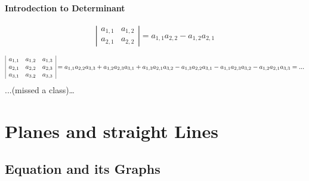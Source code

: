 \documentclass[11pt]{book}
\begin{document}
\paragraph{Introdection to Determinant}

$$
\left|\begin{array}{ll}
  a_{1,1} & a_{1,2} \\
  a_{2,1} & a_{2,2}
  \end{array}\right|=a_{1,1} a_{2,2}-a_{1,2} a_{2,1}
$$

$$
\begin{array}{|lll|l}
  a_{1,1} & a_{1,2} & a_{1,3} \\
  a_{2,1} & a_{2,2} & a_{2,3} \\
  a_{3,1} & a_{3,2} & a_{3,3}
  \end{array} 
  =a_{1,1} a_{2,2} a_{3,3}+a_{1,2} a_{2,3} a_{3,1}+a_{1,3} a_{2,1} a_{3,2}-a_{1,3} a_{2,2} a_{3,1}-a_{1,1} a_{2,3} a_{3,2}-a_{1,2} a_{2,1} a_{3,3}\\
  =...
$$
...(missed a class)\dots

\section{Planes and straight Lines}
\subsection{Equation and its Graphs}
\end{document}
